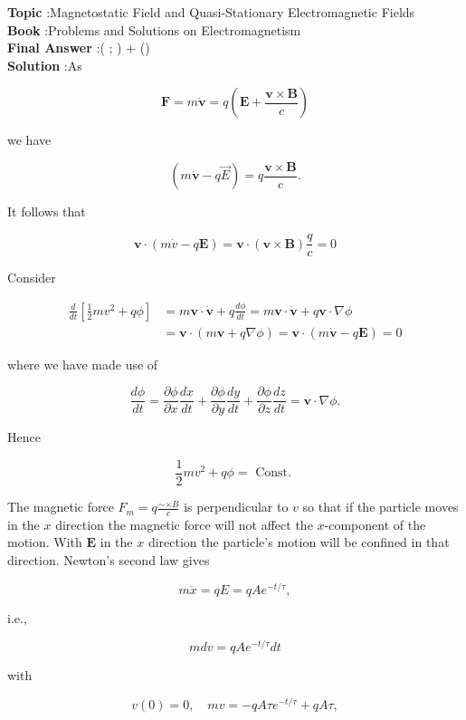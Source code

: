 \documentclass[10pt]{article}
\begin{document}
\textbf{Topic} :Magnetostatic Field and Quasi-Stationary Electromagnetic Fields\\
\textbf{Book} :Problems and Solutions on Electromagnetism\\
\textbf{Final Answer} :(\boldsymbol{\mu} ; \nabla) +\boldsymbol{\mu} \times(\nabla \times {})\\


\textbf{Solution} :As

$$
\mathbf{F}=m \dot{\mathbf{v}}=q\left(\mathbf{E}+\frac{\mathbf{v} \times \mathbf{B}}{c}\right)
$$

we have

$$
(m \dot{\mathbf{v}}-q \vec{E})=q \frac{\mathbf{v} \times \mathbf{B}}{c} .
$$

It follows that

$$
\mathbf{v} \cdot(m \dot{v}-q \mathbf{E})=\mathbf{v} \cdot(\mathbf{v} \times \mathbf{B}) \frac{q}{c}=0
$$

Consider

$$
\begin{aligned}
\frac{d}{d t}\left[\frac{1}{2} m v^{2}+q \phi\right] &=m \mathbf{v} \cdot \dot{\mathbf{v}}+q \frac{d \phi}{d t}=m \mathbf{v} \cdot \dot{\mathbf{v}}+q \mathbf{v} \cdot \nabla \phi \\
&=\mathbf{v} \cdot(m \mathbf{v}+q \nabla \phi)=\mathbf{v} \cdot(m \dot{\mathbf{v}}-q \mathbf{E})=0
\end{aligned}
$$

where we have made use of

$$
\frac{d \phi}{d t}=\frac{\partial \phi}{\partial x} \frac{d x}{d t}+\frac{\partial \phi}{\partial y} \frac{d y}{d t}+\frac{\partial \phi}{\partial z} \frac{d z}{d t}=\mathbf{v} \cdot \nabla \phi .
$$

Hence

$$
\frac{1}{2} m v^{2}+q \phi=\text { Const. }
$$

 The magnetic force $F_{m}=q \frac{\sim \times B}{c}$ is perpendicular to $v$ so that if the particle moves in the $x$ direction the magnetic force will not affect the $x$-component of the motion. With $\mathbf{E}$ in the $x$ direction the particle's motion will be confined in that direction. Newton's second law gives

$$
m \ddot{x}=q E=q A e^{-t / \tau},
$$

i.e.,

$$
m d v=q A e^{-t / \tau} d t
$$

with

$$
v(0)=0, \quad m v=-q A \tau e^{-t / \tau}+q A \tau,
$$
\end{document}

